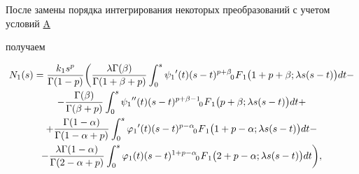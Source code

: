 После замены порядка интегрирования некоторых преобразований с учетом  условий \hyperlink{d:uslA}{A} 

получаем

\begin{multline}

N_1(s) = \frac{k_1 s^p}{\Gamma(1-p)} 

\biggl( \frac{\lambda \Gamma(\beta)}{\Gamma(1+\beta+p)} \int _0^s {\psi_1}'(t) (s-t)^{p+\beta}  \,\,

F_{\hspace{-4mm}0 \hspace{3mm}1} \bigl(1+p+\beta;\lambda s (s-t)\bigr) dt - 

\\

 - \frac{\Gamma(\beta)}{\Gamma(\beta+p)} \int _0^s {\psi_1}''(t) (s-t)^{p+\beta-1}  \,\,

F_{\hspace{-4mm}0 \hspace{3mm}1} \bigl(p+\beta;\lambda s (s-t)\bigr) dt + 

\\

 +\frac{\Gamma(1-\alpha)}{\Gamma(1-\alpha+p)} \int _0^s {\varphi_1}'(t) (s-t)^{p-\alpha}  \,\,

F_{\hspace{-4mm}0 \hspace{3mm}1} \bigl(1+p-\alpha;\lambda s (s-t)\bigr) dt - 

\\

\label{dolg:eq35}

-  \frac{\lambda \Gamma(1-\alpha)}{\Gamma(2-\alpha+p)} \int _0^s {\varphi_1}(t) (s-t)^{1+p-\alpha}  \,\,

F_{\hspace{-4mm}0 \hspace{3mm}1} \bigl(2+p-\alpha;\lambda s (s-t)\bigr) dt\biggr),

\end{multline}

